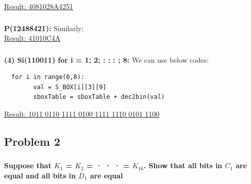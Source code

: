 \documentclass[11pt]{article}
\begin{document}
\bigskip\underline{Result: 4081028A4251}\\

\subsubsection{}
\bigskip\textbf{P(12488421): }
Similarly;\\

\bigskip\underline{Result: 41010C4A}\\

\subsubsection{}
\textbf{(4) Si(110011) for i = 1; 2; : : : ; 8:}
We can use below codes: 
\lstset{language=Python}
\lstset{frame=lines}
\lstset{basicstyle=\footnotesize}
\begin{lstlisting}
  for i in range(0,8):
        val = S_BOX[i][3][9]
        sboxTable = sboxTable + dec2bin(val)
\end{lstlisting}

\bigskip\underline{Result: 1011 0110 1111 0100 1111 1110 0101 1100 }\\




\subsection{Problem 2}
\subsubsection{}
\textbf{Suppose that $K_{1}$ = $K_{2}$ = · · · = $K_{16}$. Show that all bits in $C_{1}$ are equal and all bits in $D_{1}$
are equal}\\
 
\end{document}
